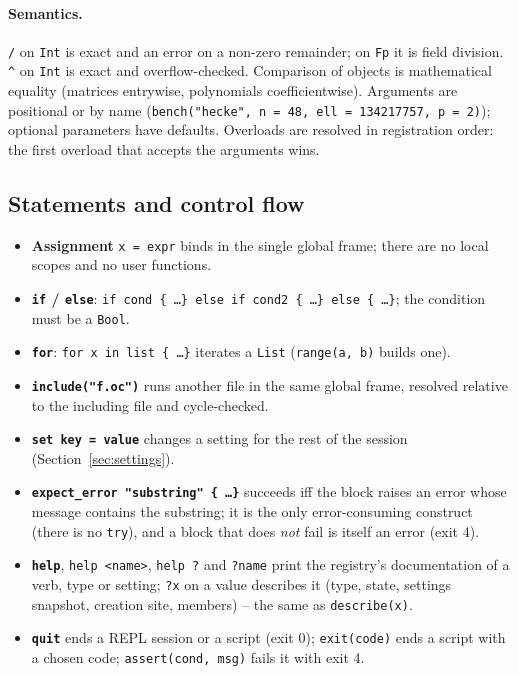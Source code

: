 \documentclass[11pt,openany]{report}
\newcommand{\vb}[1]{\texttt{#1}}
\begin{document}
\paragraph{Semantics.} \texttt{/} on \vb{Int} is exact and an error on a non-zero remainder; on \vb{Fp}
it is field division. \texttt{\^{}} on \vb{Int} is exact and overflow-checked. Comparison of objects is
mathematical equality (matrices entrywise, polynomials coefficientwise). Arguments are positional or
by name (\vb{bench("hecke", n = 48, ell = 134217757, p = 2)}); optional parameters have defaults.
Overloads are resolved in registration order: the first overload that accepts the arguments wins.

\subsection{Statements and control flow}
\begin{itemize}[nosep]
\item \textbf{Assignment} \texttt{x = expr} binds in the single global frame; there are no local scopes
  and no user functions.
\item \textbf{\texttt{if} / \texttt{else}}: \texttt{if cond \{ \dots \} else if cond2 \{ \dots \} else \{ \dots \}}; the
  condition must be a \vb{Bool}.
\item \textbf{\texttt{for}}: \texttt{for x in list \{ \dots \}} iterates a \vb{List} (\vb{range(a, b)} builds one).
\item \textbf{\texttt{include("f.oc")}} runs another file in the same global frame, resolved relative to
  the including file and cycle-checked.
\item \textbf{\texttt{set key = value}} changes a setting for the rest of the session
  (Section~\ref{sec:settings}).
\item \textbf{\texttt{expect\_error "substring" \{ \dots \}}} succeeds iff the block raises an error whose
  message contains the substring; it is the only error-consuming construct (there is no \texttt{try}),
  and a block that does \emph{not} fail is itself an error (exit 4).
\item \textbf{\texttt{help}}, \texttt{help <name>}, \texttt{help ?} and \texttt{?name} print the registry's
  documentation of a verb, type or setting; \texttt{?x} on a value describes it (type, state, settings
  snapshot, creation site, members) -- the same as \vb{describe(x)}.
\item \textbf{\texttt{quit}} ends a REPL session or a script (exit 0); \vb{exit(code)} ends a script with a
  chosen code; \vb{assert(cond, msg)} fails it with exit 4.
\end{itemize}
\end{document}
